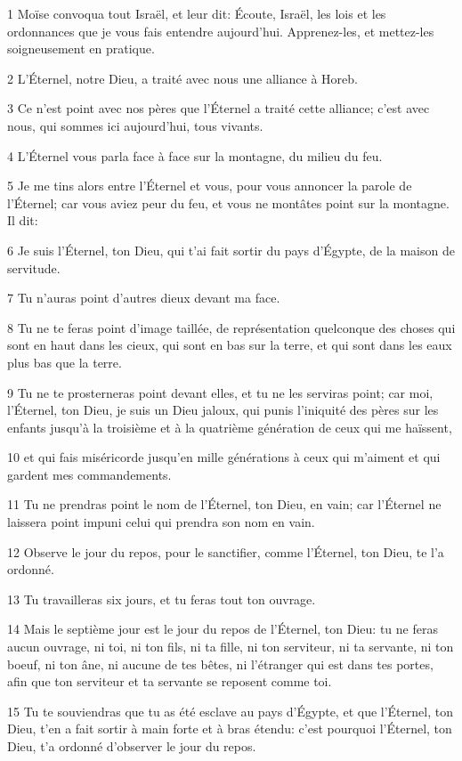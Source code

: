 \par 1 Moïse convoqua tout Israël, et leur dit: Écoute, Israël, les lois et les ordonnances que je vous fais entendre aujourd'hui. Apprenez-les, et mettez-les soigneusement en pratique.
\par 2 L'Éternel, notre Dieu, a traité avec nous une alliance à Horeb.
\par 3 Ce n'est point avec nos pères que l'Éternel a traité cette alliance; c'est avec nous, qui sommes ici aujourd'hui, tous vivants.
\par 4 L'Éternel vous parla face à face sur la montagne, du milieu du feu.
\par 5 Je me tins alors entre l'Éternel et vous, pour vous annoncer la parole de l'Éternel; car vous aviez peur du feu, et vous ne montâtes point sur la montagne. Il dit:
\par 6 Je suis l'Éternel, ton Dieu, qui t'ai fait sortir du pays d'Égypte, de la maison de servitude.
\par 7 Tu n'auras point d'autres dieux devant ma face.
\par 8 Tu ne te feras point d'image taillée, de représentation quelconque des choses qui sont en haut dans les cieux, qui sont en bas sur la terre, et qui sont dans les eaux plus bas que la terre.
\par 9 Tu ne te prosterneras point devant elles, et tu ne les serviras point; car moi, l'Éternel, ton Dieu, je suis un Dieu jaloux, qui punis l'iniquité des pères sur les enfants jusqu'à la troisième et à la quatrième génération de ceux qui me haïssent,
\par 10 et qui fais miséricorde jusqu'en mille générations à ceux qui m'aiment et qui gardent mes commandements.
\par 11 Tu ne prendras point le nom de l'Éternel, ton Dieu, en vain; car l'Éternel ne laissera point impuni celui qui prendra son nom en vain.
\par 12 Observe le jour du repos, pour le sanctifier, comme l'Éternel, ton Dieu, te l'a ordonné.
\par 13 Tu travailleras six jours, et tu feras tout ton ouvrage.
\par 14 Mais le septième jour est le jour du repos de l'Éternel, ton Dieu: tu ne feras aucun ouvrage, ni toi, ni ton fils, ni ta fille, ni ton serviteur, ni ta servante, ni ton boeuf, ni ton âne, ni aucune de tes bêtes, ni l'étranger qui est dans tes portes, afin que ton serviteur et ta servante se reposent comme toi.
\par 15 Tu te souviendras que tu as été esclave au pays d'Égypte, et que l'Éternel, ton Dieu, t'en a fait sortir à main forte et à bras étendu: c'est pourquoi l'Éternel, ton Dieu, t'a ordonné d'observer le jour du repos.
